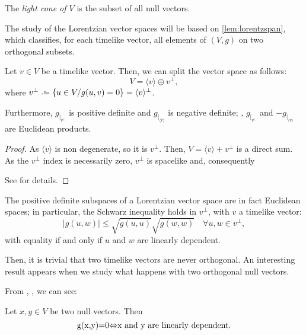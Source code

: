 \begin{definition}
	The \emph{light cone of $V$} is the subset of all null vectors.
\end{definition}

The study of the Lorentzian vector spaces will be based on \autoref{lem:lorentzspan}, which classifies, for each timelike vector, all elements of $(V,g)$ on two orthogonal subsets.

\begin{lemma}
	\label{lem:lorentzspan}
	Let $v \in V$ be a timelike vector. Then, we can split the vector space as follows:
	\[
		V = \langle v \rangle \oplus v^\perp,
	\]
	where $v^\perp \defeq \{u \in V / g(u,v) = 0\} = \langle v \rangle^\perp$.
	
	Furthermore, $g_{\mid_{v^\perp}}$ is positive definite and $g_{\mid_{\langle v \rangle}}$ is negative definite; \ie, $g_{\mid_{v^\perp}}$ and $-g_{\mid_{\langle v \rangle}}$ are Euclidean products.
\end{lemma}

\begin{proof}
	As $\langle v \rangle$ is non degenerate, so it is $v^\perp$. Then, $V = \langle v \rangle + v^\perp$ is a direct sum. As the $v^\perp$ index is necessarily zero, $v^\perp$ is spacelike and, consequently
	
	See \cite[Lemma 5.26]{oneill83} for details.
\end{proof}

\begin{remark}\label{classic_Schwarz}
	The positive definite subspaces of a Lorentzian vector space are in fact Euclidean spaces; in particular, the Schwarz inequality holds in $v^\perp$, with $v$ a timelike vector:
    \begin{equation}
	    \label{eq:schwarz}
        \lvert g(u,w) \rvert \leq \sqrt{g(u,u)} \sqrt{g(w,w)} \quad \forall u,w \in v^\perp,
    \end{equation}
    with equality if and only if $u$ and $w$ are linearly dependent.
\end{remark}

Then, it is trivial that two timelike vectors are never orthogonal. An interesting result appears when we study what happens with two orthogonal null vectors.

From \cite[Cor. 1.1.5]{sachs77}, \cite[p. 155]{oneill83}, we can see:

\begin{proposition} Let $x,y \in V$ be two null vectors. Then
	\[
		$g(x,y)=0$ \Leftrightarrow $x$ \textrm{ and } $y$ \textrm{ are linearly dependent}.
	\]
\end{proposition}

